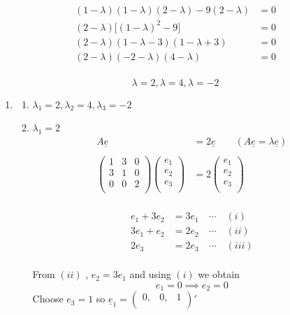 \documentclass[11pt,a4paper]{article}
\theoremstyle{definition}
\begin{document}
\begin{align*}
(1-\lambda)(1-\lambda)(2-\lambda)-9(2-\lambda) & = 0\\
(2-\lambda)\big[(1-\lambda)^2-9\big] & = 0\\
(2-\lambda)(1-\lambda - 3) (1-\lambda + 3) & = 0\\
(2-\lambda)(-2-\lambda)(4-\lambda) & = 0\\
\end{align*}


$$\lambda = 2,  \lambda = 4,  \lambda = -2$$


\begin{enumerate}
\item
\begin{enumerate}
     \item $\lambda_1 = 2,  \lambda_2 = 4,  \lambda_3 = -2$
     
     \item $\lambda_1 = 2$
     \begin{align*}
     A\underline{e} & = 2 \underline{e}\qquad  (A\underline{e}  = \lambda \underline{e})\\\\
     \begin{pmatrix}
     1 & 3 & 0\\
     3 & 1 & 0\\
     0 & 0 & 2\\
     \end{pmatrix}\begin{pmatrix}
     e_1\\
     e_2\\
     e_3\\
     \end{pmatrix} & = 2\begin{pmatrix}
     e_1\\
     e_2\\
     e_3\\
     \end{pmatrix}\\
     \end{align*}
     

\begin{align*}
e_1 + 3e_2 & = 3e_1 \quad \cdots\quad  (i)\\
3e_1 + e_2 & = 2e_2\quad \cdots\quad  (ii)\\
     2e_3 & = 2e_3\quad  \cdots\quad  (iii)\\
\end{align*}

From $(ii)$ , $e_2=3e_1$ and using $(i)$ we obtain $$e_1 =0 \implies e_2 = 0$$
Choose $e_3 = 1$ so $\underline{e}_1 = \begin{pmatrix}
0, & 0, & 1\\
\end{pmatrix}'$\\\\




\end{enumerate}
\end{enumerate}
\end{document}
